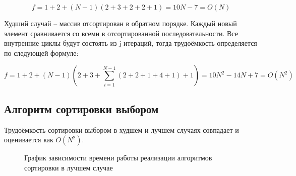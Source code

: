             \begin{equation}
                f = 1 + 2 + (N-1)(2 + 3 + 2 + 2 + 1) = 10N - 7 = O(N)
            \end{equation}

            Худший случай -- массив отсортирован в обратном порядке. 
            Каждый новый элемент сравнивается со всеми в отсортированной последовательности.
            Все внутренние циклы будут состоять из j итераций, тогда
            трудоёмкость определяется по следующей формуле:

            \begin{equation}
                f = 1 + 2 + (N-1)(2 + 3 + \sum_{i=1}^{N-1} (2 + 2 + 1 + 4 + 1) + 1) = 10N^2 - 14N + 7 = O(N^2)
            \end{equation}

        \subsection{Алгоритм сортировки выбором}
            Трудоёмкость сортировки выбором в худшем и лучшем случаях совпадает
            и оценивается как $ O(N^2) $.       

    \begin{figure}[h!]
        \centering
        \caption{График зависимости времени работы реализации алгоритмов сортировки в лучшем случае} 
        \label{graph:test:best:1}
    \end{figure}

